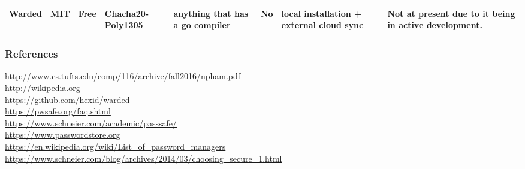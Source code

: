 \documentclass{beamer}
\begin{document}
\begin{frame}
{\begin{tabular}{@{}ccm{3cm}m{3cm}m{3cm}m{3cm}m{3cm}m{3cm}@{}}
      Warded             & MIT                  & Free                           & Chacha20-Poly1305                                                  & anything that has a go compiler          & No                           & local installation + external cloud sync        & Not at present due to it being in active development. \\ \bottomrule
    \end{tabular}
  }
\end{frame}

\begin{frame}%
  \frametitle{References}
  \url{http://www.cs.tufts.edu/comp/116/archive/fall2016/npham.pdf}\\
  \url{http://wikipedia.org}\\
  \url{https://github.com/hexid/warded}\\
  \url{https://pwsafe.org/faq.shtml}\\
  \url{https://www.schneier.com/academic/passsafe/}\\
  \url{https://www.passwordstore.org}\\
  \url{https://en.wikipedia.org/wiki/List_of_password_managers}\\
  \url{https://www.schneier.com/blog/archives/2014/03/choosing_secure_1.html}\\
\end{frame}
\end{document}
